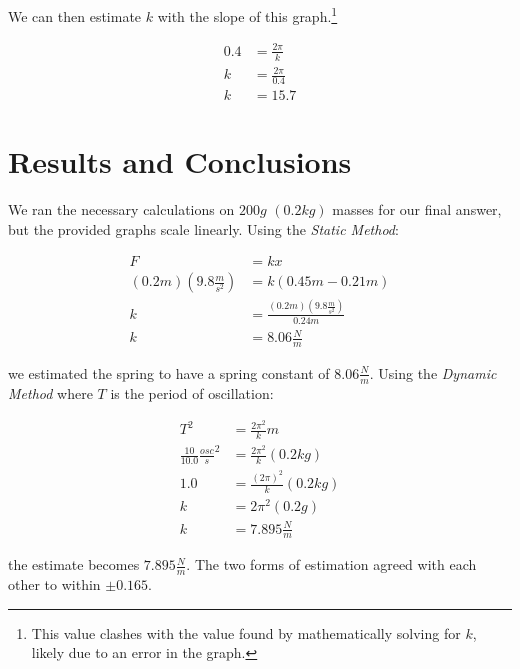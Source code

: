 \documentclass{article}
\begin{document}
\begin{center}
\end{center}

We can then estimate $k$ with the slope of this graph.\footnote{This value clashes with the value found by mathematically solving for $k$, likely due to an error in the graph.}

\begin{center}
\begin{align*}
0.4 &= \frac{2\pi}{k} \\
k &= \frac{2\pi}{0.4} \\
k &= 15.7
\end{align*}
\end{center}

\section{Results and Conclusions}

We ran the necessary calculations on $200g$ $(0.2kg)$ masses for our final answer, but the provided graphs scale linearly. Using the \emph{Static Method}:

\begin{align*}
F &= kx \\
(0.2m)(9.8\frac{m}{s^2}) &= k(0.45m-0.21m) \\
k &= \frac{(0.2m)(9.8\frac{m}{s^2})}{0.24m} \\
k &= 8.06\frac{N}{m}
\end{align*}

we estimated the spring to have a spring constant of $8.06\frac{N}{m}$.
Using the \emph{Dynamic Method} where $T$ is the period of oscillation:

\begin{align*}
T^{2} &= \frac{2\pi^{2}}{k}m \\
\frac{10}{10.0}\frac{osc}{s}^2 &= \frac{2\pi^{2}}{k}(0.2kg) \\
1.0 &= \frac{(2\pi)^{2}}{k}(0.2kg) \\
k &= 2\pi^2(0.2g) \\
k &= 7.895\frac{N}{m}
\end{align*}

the estimate becomes $7.895\frac{N}{m}$. The two forms of estimation agreed with each other to within $\pm{0.165}$.
\end{document}
